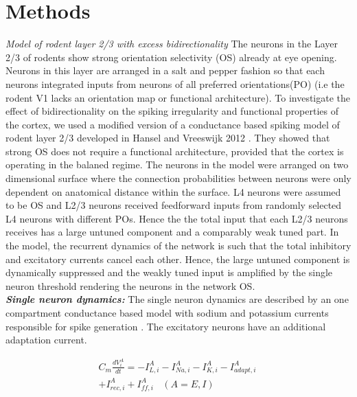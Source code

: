 \section{Methods}
\textit{Model of rodent layer 2/3 with excess bidirectionality}
The neurons in the Layer 2/3 of rodents show strong orientation selectivity (OS) already at eye opening. Neurons in this layer are arranged in a salt and pepper fashion so that each neurons integrated inputs from neurons of all preferred orientations(PO) (i.e the rodent V1 lacks an orientation map or functional architecture). To investigate the effect of bidirectionality on the spiking irregularity and functional properties of the cortex, we used a modified version of a conductance based spiking model of rodent layer 2/3 developed in Hansel and Vreeswijk 2012 \cite{Hansel2012}. They showed that strong OS does not require a functional architecture, provided that the cortex is operating in the balaned regime.
The neurons in the model were arranged on two dimensional surface where the connection probabilities between neurons were only dependent on anatomical distance within the surface. L4 neurons were assumed to be OS and L2/3 neurons received feedforward inputs from randomly selected L4 neurons with different POs. Hence the the total input that each L2/3 neurons receives has a large untuned component and a comparably weak tuned part. In the model, the recurrent dynamics of the network is such that the total inhibitory and excitatory currents cancel each other. Hence, the large untuned component is dynamically suppressed and the weakly tuned input is amplified by the single neuron threshold rendering the neurons in the network OS. \\


\textbf{\textit{Single neuron dynamics:}}
The single neuron dynamics are described by an one compartment conductance based model with sodium and potassium currents responsible for spike generation \cite{wang1996}. The excitatory neurons have an additional adaptation current.

\begin{equation}
\begin{split}
C_{m} \frac{dV_{i}^{A}}{dt} = -I_{L, i}^{A} -I_{Na, i}^{A}-I_{K, i}^{A} -I_{adapt, i}^{A}\  \\ + I_{rec, i}^{A} + I_{ff, i}^{A} \,\,\;\; (A = E, I) 
\end{split}
\end{equation}

